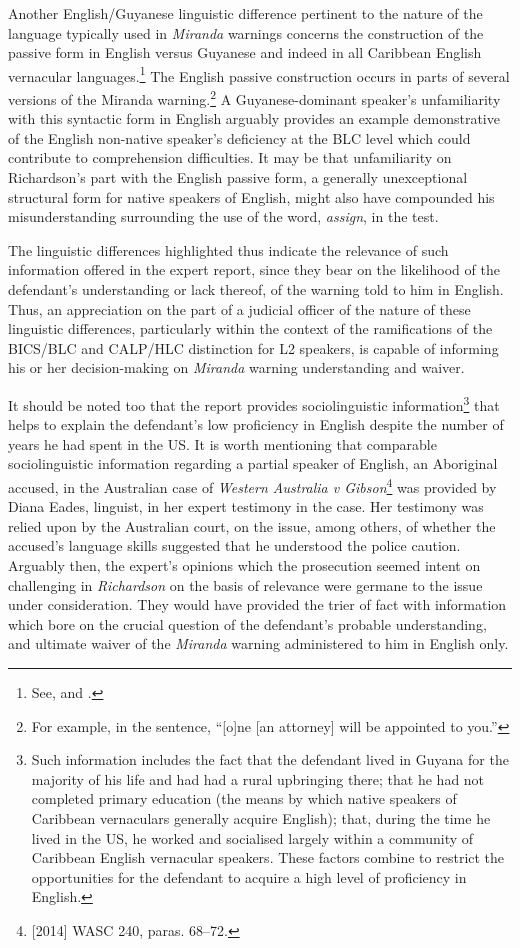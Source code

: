 \documentclass[output=paper,colorlinks,citecolor=brown]{langscibook}
\begin{document}
Another English/Guyanese linguistic difference pertinent to the nature of the language typically used in \emph{Miranda} warnings concerns the construction of the passive form in English versus Guyanese and indeed in all Caribbean English vernacular languages.\footnote{See, \citet[109--110]{DevonishThompson2010} and \citet[97]{Alleyne1980}.} The English passive construction occurs in parts of several versions of the Miranda warning.\footnote{For example, in the sentence, “[o]ne [an attorney] will be appointed to you.”} A Guyanese-dominant speaker’s unfamiliarity with this syntactic form in English arguably provides an example demonstrative of the English non-native speaker’s deficiency at the BLC level which could contribute to comprehension difficulties. It may be that unfamiliarity on Richardson’s part with the English passive form, a generally unexceptional structural form for native speakers of English, might also have compounded his misunderstanding surrounding the use of the word, \emph{assign}, in the test.

The linguistic differences highlighted thus indicate the relevance of such information offered in the expert report, since they bear on the likelihood of the defendant’s understanding or lack thereof, of the warning told to him in English. Thus, an appreciation on the part of a judicial officer of the nature of these linguistic differences, particularly within the context of the ramifications of the BICS/BLC and CALP/HLC distinction for L2 speakers, is capable of informing his or her decision-making on \emph{Miranda} warning understanding and waiver.

\largerpage
It should be noted too that the report provides sociolinguistic information\footnote{Such information includes the fact that the defendant lived in Guyana for the majority of his life and had had a rural upbringing there; that he had not completed primary education (the means by which native speakers of Caribbean vernaculars generally acquire English); that, during the time he lived in the US, he worked and socialised largely within a community of Caribbean English vernacular speakers. These factors combine to restrict the opportunities for the defendant to acquire a high level of proficiency in English.} that helps to explain the defendant’s low proficiency in English despite the number of years he had spent in the US. It is worth mentioning that comparable sociolinguistic information regarding a partial speaker of English, an Aboriginal accused, in the Australian case of \emph{Western Australia v Gibson}\footnote{[2014] WASC 240, paras. 68--72.} was provided by Diana Eades, linguist, in her expert testimony in the case. Her testimony was relied upon by the Australian court, on the issue, among others, of whether the accused’s language skills suggested that he understood the police caution. Arguably then, the expert’s opinions which the prosecution seemed intent on challenging in \emph{Richardson} on the basis of relevance were germane to the issue under consideration. They would have provided the trier of fact with information which bore on the crucial question of the defendant’s probable understanding, and ultimate waiver of the \emph{Miranda} warning administered to him in English only.
\end{document}
